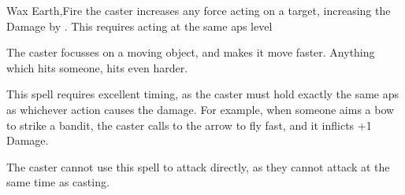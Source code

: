   {}%
  {Wax}%
  {Earth,Fire}%
  {}%
  {the caster increases any force acting on a target, increasing the Damage by . This requires acting at the same \glspl{ap} level}%
  {
    The caster focusses on a moving object, and makes it move faster.
    Anything which hits someone, hits even harder.

    This spell requires excellent timing, as the caster must hold exactly the same \glspl{ap} as whichever action causes the damage.
    For example, when someone aims a bow to strike a bandit, the caster calls to the arrow to fly fast, and it inflicts +1 Damage.

    The caster cannot use this spell to attack directly, as they cannot attack at the same time as casting.
  }
